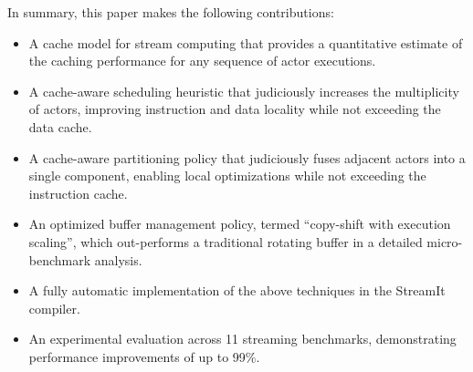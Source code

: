 In summary, this paper makes the following contributions:
\begin{itemize}

\item A cache model for stream computing that provides a quantitative
estimate of the caching performance for any sequence of actor
executions.

\item A cache-aware scheduling heuristic that judiciously increases
the multiplicity of actors, improving instruction and data locality
while not exceeding the data cache.

\item A cache-aware partitioning policy that judiciously fuses
adjacent actors into a single component, enabling local optimizations
while not exceeding the instruction cache.

\item An optimized buffer management policy, termed ``copy-shift with
execution scaling'', which out-performs a traditional rotating buffer
in a detailed micro-benchmark analysis.

\item A fully automatic implementation of the above techniques in the
StreamIt compiler.

\item An experimental evaluation across 11 streaming benchmarks,
demonstrating performance improvements of up to 99\%.
\end{itemize}


